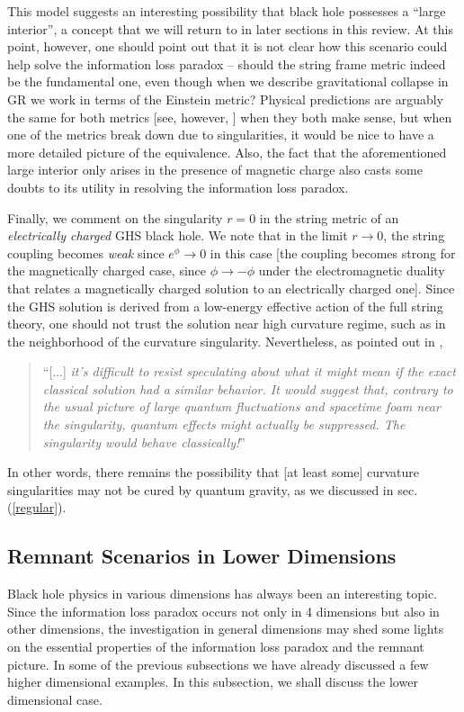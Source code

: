 \documentclass[12pt]{article}
\newcommand{\2}{$^2$}
\newcommand{\3}{$^3$}
\newcommand{\4}{$_4$}
\newcommand{\5}{$_5$}
\begin{document}
This model suggests an interesting possibility that black hole possesses a ``large interior'', a concept that we will return to in later sections in this review. At this point, however, one should point out that it is not clear how this scenario could help solve the information loss paradox -- should the string frame metric indeed be the fundamental one, even though when we describe gravitational collapse in GR we work in terms of the Einstein metric? Physical predictions are arguably the same for both metrics \cite{0111031} [see, however, \cite{9806032}] when they both make sense, but when one of the metrics break down due to singularities, it would be nice to have a more detailed picture of the equivalence. 
Also, the fact that the aforementioned large interior only arises in the presence of magnetic charge also casts some doubts to its utility in resolving the information loss paradox.

Finally, we comment on the singularity $r=0$ in the string metric of an \emph{electrically charged} GHS black hole. We note that in the limit $r \to 0$, the string coupling becomes \emph{weak} since $e^\phi \to 0$ in this case [the coupling becomes strong for the magnetically charged case, since $\phi \to -\phi$ under the electromagnetic duality that relates a magnetically charged solution to an electrically charged one]. Since the GHS solution is derived from a low-energy effective action of the full string theory, one should not trust the solution near high curvature regime, such as in the neighborhood of the curvature singularity. Nevertheless, as pointed out in \cite{dark},
\begin{quote}
``[...] \emph{it's difficult to resist speculating about what it might mean if the exact classical solution had
a similar behavior. It would suggest that, contrary to the usual picture of large quantum
fluctuations and spacetime foam near the singularity, quantum effects might actually be
suppressed. The singularity would behave classically!}''
\end{quote}
In other words, there remains the possibility that [at least some] curvature singularities may not be cured by quantum gravity, as we discussed in sec.(\ref{regular}).

\subsection{Remnant Scenarios in Lower Dimensions}

Black hole physics in various dimensions has always been an interesting topic. Since the information loss paradox occurs not only in 4 dimensions but also in other dimensions, the investigation in general dimensions may shed some lights on the essential properties of the information loss paradox and the remnant picture. In some of the previous subsections we have already discussed a few higher dimensional examples. In this subsection, we shall discuss the lower dimensional case.
\end{document}
